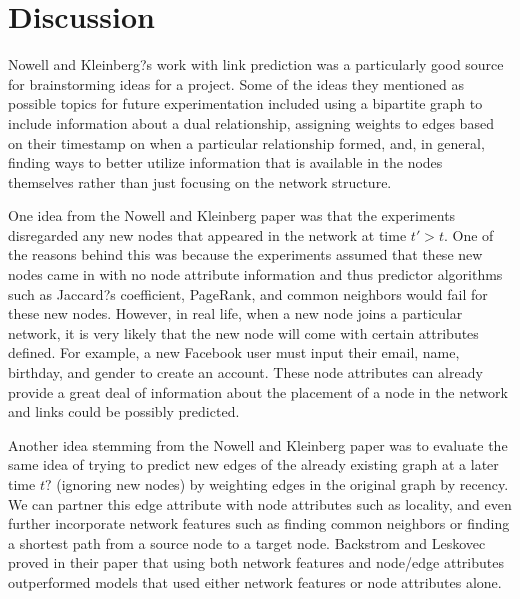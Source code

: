 \documentclass[11pt]{article}
\begin{document}
\section{Discussion}
Nowell and Kleinberg?s work with link prediction was a particularly good source for brainstorming ideas for a project.  Some of the ideas they mentioned as possible topics for future experimentation included using a bipartite graph to include information about a dual relationship, assigning weights to edges based on their timestamp on when a particular relationship formed, and, in general, finding ways to better utilize information that is available in the nodes themselves rather than just focusing on the network structure.\\
\par
One idea from the Nowell and Kleinberg paper was that the experiments disregarded any new nodes that appeared in the network at time $t' > t$.  One of the reasons behind this was because the experiments assumed that these new nodes came in with no node attribute information and thus predictor algorithms such as Jaccard?s coefficient, PageRank, and common neighbors would fail for these new nodes.  However, in real life, when a new node joins a particular network, it is very likely that the new node will come with certain attributes defined.  For example, a new Facebook user must input their email, name, birthday, and gender to create an account.  These node attributes can already provide a great deal of information about the placement of a node in the network and links could be possibly predicted.\\
\par
Another idea stemming from the Nowell and Kleinberg paper was to evaluate the same idea of trying to predict new edges of the already existing graph at a later time $t?$ (ignoring new nodes) by weighting edges in the original graph by recency.  We can partner this edge attribute with node attributes such as locality, and even further incorporate network features such as finding common neighbors or finding a shortest path from a source node to a target node.  Backstrom and Leskovec proved in their paper \cite{backstromjure} that using both network features and node/edge attributes outperformed models that used either network features \cite{nowellklein} or node attributes \cite{myersjure} alone.\\
\par
\end{document}
